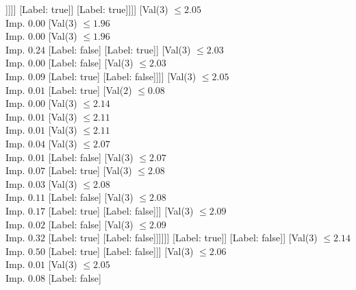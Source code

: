 \documentclass[margin=10pt]{standalone}
\begin{document}
\begin{forest}
															[Label: false]
															[Val($3$) $ \leq 1.93$ \\ Imp. $0.44$
																[Label: true]
																[Label: false]]]]]
												[Label: true]]
											[Label: true]]]]
								[Val($3$) $ \leq 2.05$ \\ Imp. $0.00$
									[Val($3$) $ \leq 1.96$ \\ Imp. $0.00$
										[Val($3$) $ \leq 1.96$ \\ Imp. $0.24$
											[Label: false]
											[Label: true]]
										[Val($3$) $ \leq 2.03$ \\ Imp. $0.00$
											[Label: false]
											[Val($3$) $ \leq 2.03$ \\ Imp. $0.09$
												[Label: true]
												[Label: false]]]]
									[Val($3$) $ \leq 2.05$ \\ Imp. $0.01$
										[Label: true]
										[Val($2$) $ \leq 0.08$ \\ Imp. $0.00$
											[Val($3$) $ \leq 2.14$ \\ Imp. $0.01$
												[Val($3$) $ \leq 2.11$ \\ Imp. $0.01$
													[Val($3$) $ \leq 2.11$ \\ Imp. $0.04$
														[Val($3$) $ \leq 2.07$ \\ Imp. $0.01$
															[Label: false]
															[Val($3$) $ \leq 2.07$ \\ Imp. $0.07$
																[Label: true]
																[Val($3$) $ \leq 2.08$ \\ Imp. $0.03$
																	[Val($3$) $ \leq 2.08$ \\ Imp. $0.11$
																		[Label: false]
																		[Val($3$) $ \leq 2.08$ \\ Imp. $0.17$
																			[Label: true]
																			[Label: false]]]
																	[Val($3$) $ \leq 2.09$ \\ Imp. $0.02$
																		[Label: false]
																		[Val($3$) $ \leq 2.09$ \\ Imp. $0.32$
																			[Label: true]
																			[Label: false]]]]]]
														[Label: true]]
													[Label: false]]
												[Val($3$) $ \leq 2.14$ \\ Imp. $0.50$
													[Label: true]
													[Label: false]]]
											[Val($3$) $ \leq 2.06$ \\ Imp. $0.01$
												[Val($3$) $ \leq 2.05$ \\ Imp. $0.08$
													[Label: false]

\end{forest}
\end{document}
